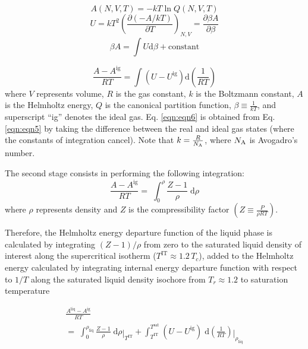 \documentclass[%
 aip,
 jcp,
 sd,%
 amsmath,amssymb,
 reprint,%
]{revtex4-1}
\begin{document}
\begin{equation}
A \left( N,V,T \right)=-kT \ln Q\left(N,V,T\right)
\label{eqn:eqn3}
\end{equation}
\begin{equation}
U=kT^{2} \left( \frac{\partial (-A/kT)}{\partial T} \right)_{N,V} =\frac{\partial \beta A}{\partial \beta }  \label{eqn:eqn4}
\end{equation}
\begin{equation}
\beta A=\int U\mathrm{d} \beta + \mathrm{constant}  \label{eqn:eqn5}
\end{equation}

\begin{equation}
 \frac{A-A^{\mathrm{ig}} }{RT} =\int \left( U-U^{\mathrm{ig}} \right) \mathrm{d}\left( \frac{1}{RT} \right) \label{eqn:eqn6}
\end{equation}
where $V$ represents volume, $R$ is the gas constant, $k$ is the Boltzmann constant, $A$ is the Helmholtz energy, $Q$ is the canonical partition function, $\beta \equiv \frac{1}{kT}$, and superscript ``ig'' denotes the ideal gas. 
Eq. \ref{eqn:eqn6} is obtained from Eq. \ref{eqn:eqn5} by taking the difference between the real and ideal gas states (where the constants of integration cancel). Note that $k =\frac{R}{N_{\rm A}}$, where $N_{\rm A}$ is Avogadro's number.

The second stage consists in performing the following integration: 
\begin{equation}
\frac{A-A^{\mathrm{ig}}}{RT} =\; \int _{0}^{\rho }\frac{Z-1}{\rho } \; \mathrm{d}\rho \label{eqn:eqn7}
\end{equation}
where $\rho$ represents density and $Z$ is the compressibility factor $(Z \equiv \frac{P}{\rho RT})$.

Therefore, the Helmholtz energy departure function of the liquid phase is calculated by integrating $(Z-1)/\rho$ from zero to the saturated liquid
density of interest along the supercritical isotherm ($T^{\mathrm{IT}} \approx 1.2\,T_c$), added to the Helmholtz energy calculated by integrating internal energy departure function with
respect to $1/T$ along the saturated liquid density isochore from $T_{r} \approx 1.2$ to saturation temperature

\begin{equation}
\begin{array}{l}
{\frac{A^{\mathrm{liq}} -A^{\mathrm{ig}} }{RT}} 
\\ 
{=\; \int _{0}^{\rho _{\mathrm{liq}} }\frac{Z-1}{\rho } \; \mathrm{d}\rho \mathop{|}\nolimits_{T^{\mathrm{IT}}} +\int _{T^{\mathrm{IT}}}^{T^{\mathrm{\mathrm{sat}}}
}(U-U^{\mathrm{ig}} )\; \mathrm{d} \left(\frac{1}{RT} \right) \mathop{|}\nolimits_{\rho _{\mathrm{liq}}}}  
\end{array} 
\label{eqn:eqn8}
\end{equation}
\end{document}
